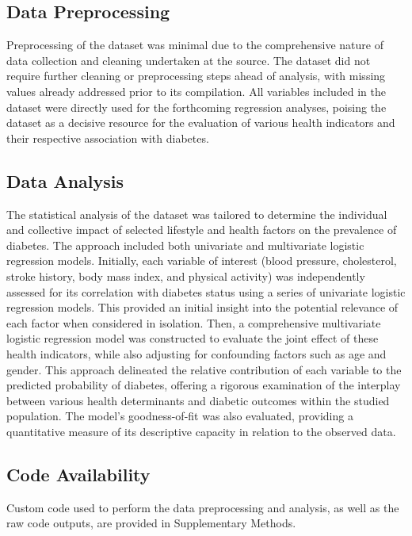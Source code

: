 \documentclass[11pt]{article}
\begin{document}
\subsection*{Data Preprocessing}
Preprocessing of the dataset was minimal due to the comprehensive nature of data collection and cleaning undertaken at the source. The dataset did not require further cleaning or preprocessing steps ahead of analysis, with missing values already addressed prior to its compilation. All variables included in the dataset were directly used for the forthcoming regression analyses, poising the dataset as a decisive resource for the evaluation of various health indicators and their respective association with diabetes.

\subsection*{Data Analysis}
The statistical analysis of the dataset was tailored to determine the individual and collective impact of selected lifestyle and health factors on the prevalence of diabetes. The approach included both univariate and multivariate logistic regression models. Initially, each variable of interest (blood pressure, cholesterol, stroke history, body mass index, and physical activity) was independently assessed for its correlation with diabetes status using a series of univariate logistic regression models. This provided an initial insight into the potential relevance of each factor when considered in isolation. Then, a comprehensive multivariate logistic regression model was constructed to evaluate the joint effect of these health indicators, while also adjusting for confounding factors such as age and gender. This approach delineated the relative contribution of each variable to the predicted probability of diabetes, offering a rigorous examination of the interplay between various health determinants and diabetic outcomes within the studied population. The model's goodness-of-fit was also evaluated, providing a quantitative measure of its descriptive capacity in relation to the observed data.\subsection*{Code Availability}

Custom code used to perform the data preprocessing and analysis, as well as the raw code outputs, are provided in Supplementary Methods.




\end{document}
